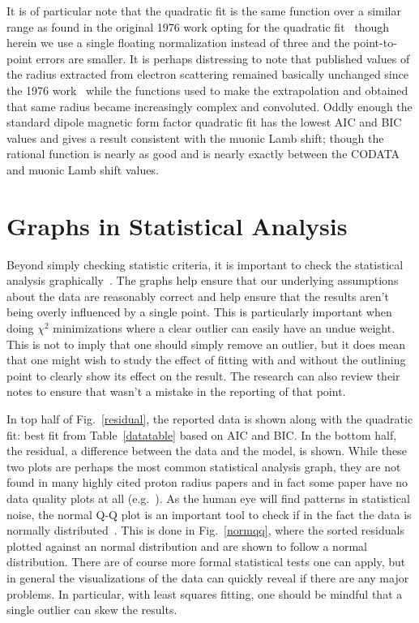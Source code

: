 \documentclass[10pt,aps,prc,twocolumn]{revtex4-1}
\begin{document}
It is of particular note that the quadratic fit is the same function over a similar range as found in the original 1976 work opting for
the quadratic fit~\cite{Borkowski:1975ume} though herein we 
use a single floating normalization instead of three and the point-to-point errors are smaller.   
It is perhaps distressing to note that published values of the 
radius extracted from electron scattering remained basically unchanged since the 1976 work~\cite{Borkowski:1975ume} while the 
functions used to make the extrapolation and obtained that same radius became increasingly complex and convoluted.
Oddly enough the standard dipole magnetic form factor quadratic fit has the lowest AIC and BIC values and gives a result consistent
with the muonic Lamb shift; though the rational function is nearly as good and is nearly exactly between the CODATA
and muonic Lamb shift values.    


\section{Graphs in Statistical Analysis}

Beyond simply checking statistic criteria, it is important to check the statistical analysis graphically~\cite{Anscombe:1973}.
The graphs help ensure that our underlying assumptions about the data are reasonably correct and help ensure that the results
aren't being overly influenced by a single point.   This is particularly important when doing $\chi^2$ minimizations where a
clear outlier can easily have an undue weight.    This is not to imply that one should simply remove an outlier, but it does
mean that one might wish to study the effect of fitting with and without the outlining point to clearly show its effect on 
the result.   The research can also review their notes to ensure that wasn't a mistake in the reporting of that point.

In top half of Fig.~\ref{residual}, the reported data is shown along with the quadratic fit:  best fit from Table~\ref{datatable} based
on AIC and BIC.   In the bottom half, the residual, a difference between the data and the model, is shown.     While these two plots
are perhaps the most common statistical analysis graph, they are not found in many highly cited proton radius papers and in fact some
paper  have no data quality plots at all (e.g.~\cite{Rosenfelder:1999cd}).
As the human eye will find patterns in statistical noise, the normal Q-Q plot is an important tool to check if in the fact the 
data is normally distributed~\cite{Wilk:1968}.   This is done in Fig.~\ref{normqq}, where the sorted residuals plotted against an normal distribution
and are shown to follow a normal distribution.   There are of course more formal statistical tests one can apply, but in general the
visualizations of the data can quickly reveal if there are any major problems.   In particular, with least squares fitting, one should
be mindful that a single outlier can skew the results.
\end{document}
